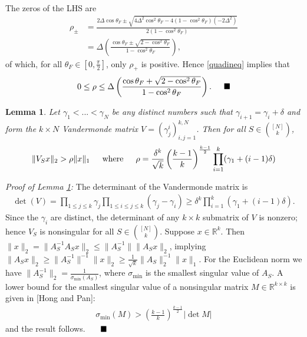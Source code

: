 \documentclass[journal,onecolumn]{IEEEtran}
\newtheorem{lemma}{Lemma}
\begin{document}
The zeros of the LHS are
\begin{align*}
\rho_{\pm} &= \frac{ 2 \Delta \cos\theta_F \pm \sqrt{ 4\Delta^2\cos^2\theta_F - 4\left(1 - \cos^2\theta_F\right)\left(-2\Delta^2\right)} }{2 \left(1-\cos^2\theta_F\right)} \\
&= \Delta \left( \frac{ \cos\theta_F \pm \sqrt{2 - \cos^2\theta_F} }{1 - \cos^2\theta_F} \right),
\end{align*}
%
of which, for all $\theta_F \in [0, \frac{\pi}{2}]$, only $\rho_{+}$ is positive. Hence \eqref{quadineq} implies that
\begin{align*}
0 \leq \rho \leq \Delta \left( \frac{ \cos\theta_F + \sqrt{2 - \cos^2\theta_F} }{1 - \cos^2\theta_F} \right). \indent \blacksquare
\end{align*}


\begin{lemma}\label{MatrixLowerBoundLemma}
Let $\gamma_1 < ... < \gamma_N$ be any distinct numbers such that $\gamma_{i+1} = \gamma_i + \delta$ and form the $k \times N$ Vandermonde matrix $V = (\gamma^i_j)^{k,N}_{i,j=1}$. Then for all $S \in {[N] \choose k}$, 
\begin{align}
	\|V_S x\|_2 > \rho \|x\|_1 \indent \text{where} \indent \rho = \frac{\delta^k}{\sqrt{k}} \left( \frac{k-1}{k} \right)^\frac{k-1}{2} \prod_{i = 1}^k (\gamma_1 + (i-1)\delta)
\end{align}
\end{lemma}

\emph{Proof of Lemma \ref{MatrixLowerBoundLemma}:} The determinant of the Vandermonde matrix is
\begin{align}
	\det(V) = \prod_{1 \leq j \leq k} \gamma_j \prod_{1 \leq i \leq j \leq k} (\gamma_j - \gamma_i) \geq \delta^k \prod_{i = 1}^k (\gamma_1 + (i-1)\delta).
\end{align}	
Since the $\gamma_i$ are distinct, the determinant of any $k \times k$ submatrix of $V$ is nonzero; hence $V_S$ is nonsingular for all $S \in {[N] \choose k}$. Suppose $x \in \mathbb{R}^k$. Then $\|x\|_2 = \|A_S^{-1} A_S x\|_2 \leq \|A_S^{-1}\| \|A_S x\|_2$, implying $\|A_Sx\|_2 \geq \|A_S^{-1}\|^{-1}\|x\|_2 \geq \frac{1}{\sqrt{k}} \|A_S\|_2^{-1}\|x\|_1$. For the Euclidean norm we have $\|A_S^{-1}\|_2 = \frac{1}{\sigma_{\min}(A_S)}$, where $\sigma_{\min}$ is the smallest singular value of $A_S$. A lower bound for the smallest singular value of a nonsingular matrix $M \in \mathbb{R}^{k \times k}$ is given in [Hong and Pan]:
\begin{align}
	\sigma_{\min}(M) > \left( \frac{k-1}{k} \right)^\frac{k-1}{2} |\det M|
\end{align}
%
and the result follows. $\indent \blacksquare$
\end{document}
